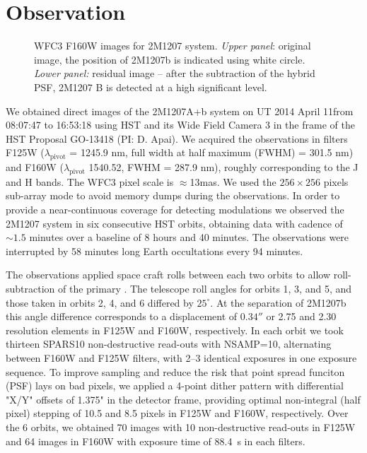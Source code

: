 \documentclass[apj]{emulateapj}
\begin{document}
\section{Observation}

\begin{figure}
  \centering
  \caption{WFC3 F160W images for 2M1207 system. {\em Upper panel}:
    original image, the position of 2M1207b is indicated using white
    circle.   {\em Lower panel:} residual image -- after the
    subtraction of the hybrid PSF, 2M1207 B is detected at a high significant level.}
  \label{fig:1}
\end{figure}

We obtained direct images of the 2M1207A+b
system on UT 2014 April 11from 08:07:47 to 16:53:18 using HST and its Wide Field Camera 3 \citep[WFC3,
][]{Kimble2008} in the frame of the HST Proposal GO-13418 (PI:
D. Apai). We acquired the observations in filters F125W
($\lambda_{\mbox{pivot}}$ = 1245.9 nm, full width at half maximum
(FWHM) = 301.5 nm) and F160W ($\lambda_{\mbox{pivot}}$ 1540.52, FWHM =
287.9 nm), roughly corresponding to the J and H bands. The WFC3 pixel
scale is $\approx$13mas. We used the $256\times256$ pixels sub-array
mode to avoid memory dumps during the observations.  In order to
provide a near-continuous coverage for detecting modulations we
observed the 2M1207 system in six consecutive HST orbits, obtaining
data with cadence of $\sim1.5$ minutes over a baseline of 8 hours and
40 minutes. The observations were interrupted by 58 minutes long Earth
occultations every 94 minutes.

The observations applied space craft rolls between each two orbits to
allow roll-subtraction of the primary \citep[e.g.][]{Song2006}. The
telescope roll angles for orbits 1, 3, and 5, and those taken in
orbits 2, 4, and 6 differed by $25^{\circ}$. At the separation of
2M1207b this angle difference corresponds to a displacement of
$0.34''$ or 2.75 and 2.30 resolution elements in F125W and F160W,
respectively. In each orbit we took thirteen SPARS10 non-destructive
read-outs with NSAMP=10, alternating between F160W and F125W filters,
with 2--3 identical exposures in one exposure sequence. To improve
sampling and reduce the risk that point spread funciton (PSF) lays on
bad pixels, we applied a 4-point dither pattern with differential "X/Y"
offsets of 1.375" in the detector frame, providing optimal
non-integral (half pixel) stepping of 10.5 and 8.5 pixels in F125W and
F160W, respectively. Over the 6 orbits, we obtained 70 images with 10
non-destructive read-outs in F125W and 64 images in F160W with
exposure time of 88.4~s in each filters.
\end{document}
